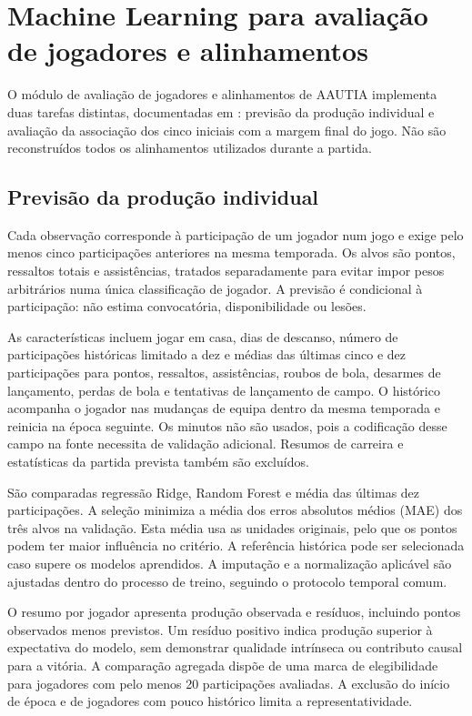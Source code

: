 \chapter{Machine Learning para avaliação de jogadores e alinhamentos}
\label{chap:desempenho}

O módulo de avaliação de jogadores e alinhamentos de AAUTIA implementa duas tarefas distintas, documentadas em
: previsão da produção individual
e avaliação da associação dos cinco iniciais com a margem final do jogo.
Não são reconstruídos todos os alinhamentos utilizados durante a partida.

\section{Previsão da produção individual}

Cada observação corresponde à participação de um jogador num jogo e
exige pelo menos cinco participações anteriores na mesma temporada.
Os alvos são pontos, ressaltos totais e assistências, tratados separadamente
para evitar impor pesos arbitrários numa única classificação de jogador.
A previsão é condicional à participação: não estima convocatória,
disponibilidade ou lesões.

As características incluem jogar em casa, dias de descanso, número de
participações históricas limitado a dez e médias das últimas cinco e dez
participações para pontos, ressaltos, assistências, roubos de bola,
desarmes de lançamento, perdas de bola e tentativas de lançamento de campo.
O histórico acompanha o jogador nas mudanças de equipa dentro da mesma
temporada e reinicia na época seguinte. Os minutos não são usados, pois
a codificação desse campo na fonte necessita de validação adicional.
Resumos de carreira e estatísticas da partida prevista também são excluídos.

São comparadas regressão Ridge, Random Forest e média das últimas dez
participações. A seleção minimiza a média dos erros absolutos médios
(MAE) dos três alvos na validação. Esta média usa as unidades originais,
pelo que os pontos podem ter maior influência no critério. A referência
histórica pode ser selecionada caso supere os modelos aprendidos.
A imputação e a normalização aplicável são ajustadas dentro do processo
de treino, seguindo o protocolo temporal comum.

O resumo por jogador apresenta produção observada e resíduos, incluindo
pontos observados menos previstos. Um resíduo positivo indica produção
superior à expectativa do modelo, sem demonstrar qualidade intrínseca ou
contributo causal para a vitória. A comparação agregada dispõe de uma
marca de elegibilidade para jogadores com pelo menos 20 participações
avaliadas. A exclusão do início de época e de jogadores com pouco histórico
limita a representatividade.

